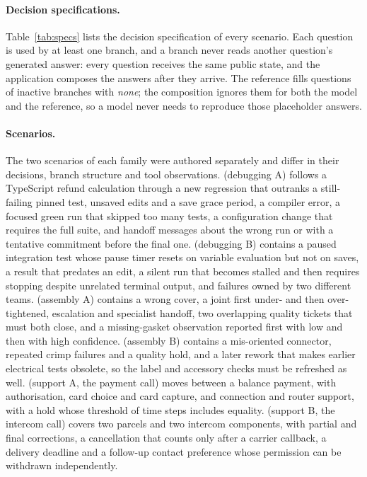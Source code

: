 \paragraph{Decision specifications.}
Table~\ref{tab:specs} lists the decision specification of every scenario.
Each question is used by at least one branch, and a branch never reads another question's generated answer: every question receives the same public state, and the application composes the answers after they arrive.
The reference fills questions of inactive branches with \emph{none}; the composition ignores them for both the model and the reference, so a model never needs to reproduce those placeholder answers.

\paragraph{Scenarios.}
The two scenarios of each family were authored separately and differ in their decisions, branch structure and tool observations.
\emph{\DebugATitle{}} (debugging A) follows a TypeScript refund calculation through a new regression that outranks a still-failing pinned test, unsaved edits and a save grace period, a compiler error, a focused green run that skipped too many tests, a configuration change that requires the full suite, and handoff messages about the wrong run or with a tentative commitment before the final one.
\emph{\DebugBTitle{}} (debugging B) contains a paused integration test whose pause timer resets on variable evaluation but not on saves, a result that predates an edit, a silent run that becomes stalled and then requires stopping despite unrelated terminal output, and failures owned by two different teams.
\emph{\AssemblyATitle{}} (assembly A) contains a wrong cover, a joint first under- and then over-tightened, escalation and specialist handoff, two overlapping quality tickets that must both close, and a missing-gasket observation reported first with low and then with high confidence.
\emph{\AssemblyBTitle{}} (assembly B) contains a mis-oriented connector, repeated crimp failures and a quality hold, and a later rework that makes earlier electrical tests obsolete, so the label and accessory checks must be refreshed as well.
\emph{\SupportATitle{}} (support A, the payment call) moves between a balance payment, with authorisation, card choice and card capture, and connection and router support, with a hold whose threshold of \SupportAHoldThresholdSteps{} time steps includes equality.
\emph{\SupportBTitle{}} (support B, the intercom call) covers two parcels and two intercom components, with partial and final corrections, a cancellation that counts only after a carrier callback, a delivery deadline and a follow-up contact preference whose permission can be withdrawn independently.

